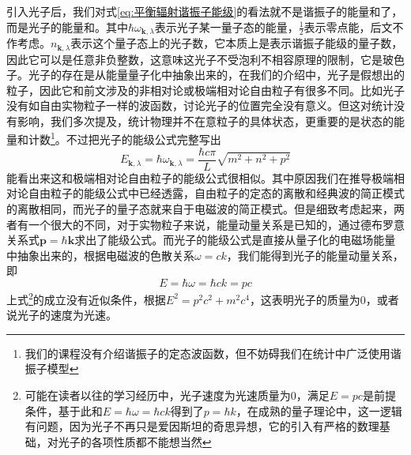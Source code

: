 \documentclass[../../main.tex]{subfiles}
\begin{document}
引入光子后，我们对式\eqref{eq:平衡辐射谐振子能级}的看法就不是谐振子的能量和了，而是光子的能量和。其中\(\hbar\omega_{\bm{k},\lambda}\)表示光子某一量子态的能量，\(\frac{1}{2}\)表示零点能，后文不作考虑。\(n_{\bm{k},\lambda}\)表示这个量子态上的光子数，它本质上是表示谐振子能级的量子数，因此它可以是任意非负整数，这意味这光子不受泡利不相容原理的限制，它是玻色子。光子的存在是从能量量子化中抽象出来的，在我们的介绍中，光子是假想出的粒子，因此它和前文涉及的非相对论或极端相对论自由粒子有很多不同。比如光子没有如自由实物粒子一样的波函数，讨论光子的位置完全没有意义。但这对统计没有影响，我们多次提及，统计物理并不在意粒子的具体状态，更重要的是状态的能量和计数\footnote{我们的课程没有介绍谐振子的定态波函数，但不妨碍我们在统计中广泛使用谐振子模型}。不过把光子的能级公式完整写出
\begin{equation}
    E_{\bm{k},\lambda}=\hbar\omega_{\bm{k},\lambda}=\frac{\hbar c\pi}{L}\sqrt{m^2+n^2+p^2}
\end{equation}
能看出来这和极端相对论自由粒子的能级公式很相似。其中原因我们在推导极端相对论自由粒子的能级公式中已经透露，自由粒子的定态的离散和经典波的简正模式的离散相同，而光子的量子态就来自于电磁波的简正模式。但是细致考虑起来，两者有一个很大的不同，对于实物粒子来说，能量动量关系是已知的，通过德布罗意关系式\(\bm{p}=\hbar\bm{k}\)求出了能级公式。而光子的能级公式是直接从量子化的电磁场能量中抽象出来的，根据电磁波的色散关系\(\omega=ck\)，我们能得到光子的能量动量关系，即
\begin{equation}
    E=\hbar\omega=\hbar ck=pc
\end{equation}
上式\footnote{可能在读者以往的学习经历中，光子速度为光速质量为0，满足\(E=pc\)是前提条件，基于此和\(E=\hbar\omega=\hbar ck\)得到了\(p=\hbar k\)，在成熟的量子理论中，这一逻辑有问题，因为光子不再只是爱因斯坦的奇思异想，它的引入有严格的数理基础，对光子的各项性质都不能想当然}的成立没有近似条件，根据\(E^2=p^2c^2+m^2c^4\)，这表明光子的质量为0，或者说光子的速度为光速。
\end{document}
